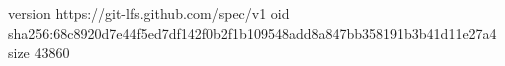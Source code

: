 version https://git-lfs.github.com/spec/v1
oid sha256:68c8920d7e44f5ed7df142f0b2f1b109548add8a847bb358191b3b41d11e27a4
size 43860
